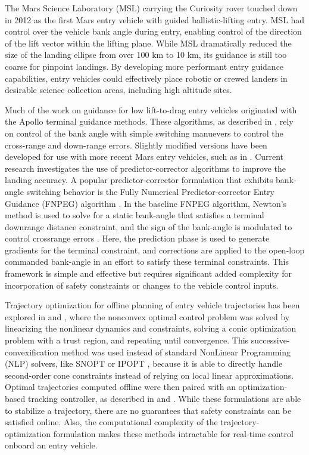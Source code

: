 The Mars Science Laboratory (MSL) carrying the Curiosity rover touched down in 2012 as the first Mars entry vehicle with guided ballistic-lifting entry.  MSL had control over the vehicle bank angle during entry, enabling control of the direction of the lift vector within the lifting plane. While MSL dramatically reduced the size of the landing ellipse from over 100 km to 10 km, its guidance is still too coarse for pinpoint landings. By developing more performant entry guidance capabilities, entry vehicles could effectively place robotic or crewed landers in desirable science collection areas, including high altitude sites. 

Much of the work on guidance for low lift-to-drag entry vehicles originated with the Apollo terminal guidance methods. These algorithms, as described in \cite{graves1972}, rely on control of the bank angle with simple switching manuevers to control the cross-range and down-range errors. Slightly modified versions have been developed for use with more recent Mars entry vehicles, such as in \cite{mendeck2014}.  Current research investigates the use of predictor-corrector algorithms \cite{brunner2012} to improve the landing accuracy. A popular predictor-corrector formulation that exhibits bank-angle switching behavior is the Fully Numerical Predictor-corrector Entry Guidance (FNPEG) algorithm \cite{lu2008}. In the baseline FNPEG algorithm, Newton's method is used to solve for a static bank-angle that satisfies a terminal downrange distance constraint, and the sign of the bank-angle is modulated to control crossrange errors \cite{lu2014}. Here, the prediction phase is used to generate gradients for the terminal constraint, and corrections are applied to the open-loop commanded bank-angle in an effort to satisfy these terminal constraints. This framework is simple and effective but requires significant added complexity for incorporation of safety constraints or changes to the vehicle control inputs.

Trajectory optimization for offline planning of entry vehicle trajectories has been explored in \cite{wang2016} and \cite{wang2018a}, where the nonconvex optimal control problem was solved by linearizing the nonlinear dynamics and constraints, solving a conic optimization problem with a trust region, and repeating until convergence. This successive-convexification method was used instead of standard NonLinear Programming (NLP) solvers, like SNOPT \cite{gill2005} or IPOPT \cite{wachter2006}, because it is able to directly handle second-order cone constraints instead of relying on local linear approximations. Optimal trajectories computed offline were then paired with an optimization-based tracking controller, as described in \cite{wang2016} and \cite{wang2018a}. While these formulations are able to stabilize a trajectory, there are no guarantees that safety constraints can be satisfied online. Also, the computational complexity of the trajectory-optimization formulation makes these methods intractable for real-time control onboard an entry vehicle.

